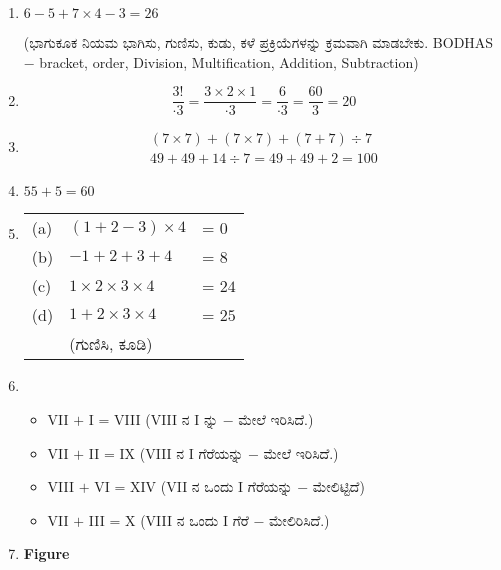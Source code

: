\begin{enumerate}
\item $6 - 5 + 7 \times 4 - 3 = 26$

(ಭಾಗುಕೂಕ ನಿಯಮ ಭಾಗಿಸು, ಗುಣಿಸು, ಕುಡು, ಕಳೆ ಪ್ರಕ್ರಿಯೆಗಳನ್ನು ಕ್ರಮವಾಗಿ ಮಾಡಬೇಕು. BODHAS $-$ bracket, order, Division, Multification, Addition, Subtraction)

\item 
\begin{equation*}
\dfrac{3!}{\cdot 3} = \dfrac{3\times 2\times 1}{\cdot 3} = \dfrac{6}{\cdot 3} = \dfrac{60}{3} = 20
\end{equation*}

\item 
\begin{gather*}
(7\times 7) + (7\times 7) + {(7 + 7) \div 7}\\
49 + 49 + 14 \div 7 = 49 + 49 + 2 = 100
\end{gather*}

\item  $55 + 5 = 60$

\item 
\begin{tabular}[t]{lll}
(a) & $(1 + 2 - 3)\times 4$ &  = $0$\\
(b) & $-1 + 2 + 3 + 4$ & = $8$\\
(c) & $1\times 2\times 3\times 4$ &  = $24$\\
(d) & $1 + 2\times 3\times 4$ &  = $25$\\
& (ಗುಣಿಸಿ, ಕೂಡಿ) & 
\end{tabular}

\item 
\begin{itemize}
\item[(a)] VII $+$ I = VIII (VIII ನ I ನ್ನು $-$ ಮೇಲೆ ಇರಿಸಿದೆ.)
\item[(b)] VII $+$ II = IX (VIII ನ I ಗೆರೆಯನ್ನು $-$ ಮೇಲೆ ಇರಿಸಿದೆ.)
\item[(c)] VIII $+$ VI = XIV (VII ನ ಒಂದು I ಗೆರೆಯನ್ನು $-$ ಮೇಲಿಟ್ಟಿದೆ)
\item[(d)] VII $+$ III = X (VIII ನ ಒಂದು I ಗೆರೆ $-$ ಮೇಲಿರಿಸಿದೆ.)
\end{itemize}

\item 
\begin{center}
{\bf Figure}
\end{center}


\end{enumerate}
